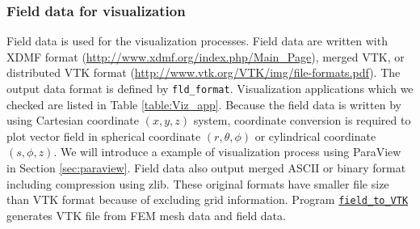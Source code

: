 \subsubsection{Field data for visualization}
\label{sec:VTK}
Field data is used for the visualization processes. Field data are written with XDMF format (\url{http://www.xdmf.org/index.php/Main_Page}), merged VTK, or distributed VTK format (\url{http://www.vtk.org/VTK/img/file-formats.pdf}). The output data format is defined by \verb|fld_format|. Visualization applications which we checked are listed in Table \ref{table:Viz_app}. Because the field data is written by using Cartesian coordinate $(x,y,z)$ system, coordinate conversion is required to plot vector field in spherical coordinate $(r, \theta, \phi)$ or cylindrical coordinate $(s,\phi, z)$. We will introduce a example of visualization process using ParaView in Section \ref{sec:paraview}. Field data also output merged ASCII or binary format including compression using zlib. These original formats have smaller file size than VTK format because of excluding grid information. Program \hyperref[sec:field_to_VTK]{\tt field\_to\_VTK} generates VTK file from FEM mesh data and field data.
%
